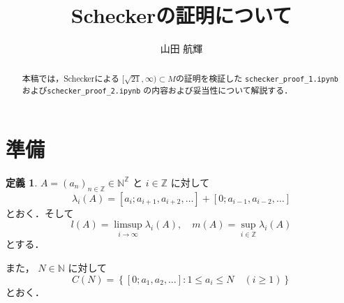 \documentclass[10pt,a4paper]{ujarticle}
\author{山田 航輝}
\title{Scheckerの証明について}
\theoremstyle{definition}
\newtheorem{definition}{定義}
\begin{document}
\maketitle

\begin{abstract}
本稿では，Schecker\cite{schecker}による $[\sqrt{21}, \infty) \subset M$の証明を検証した
\verb|schecker_proof_1.ipynb|および\verb|schecker_proof_2.ipynb|
の内容および妥当性について解説する．
\end{abstract}

\section{準備}
\begin{definition}
  \label{def:lagrange-spectrum}
  $A=(a_n)_{n\in\mathbb Z}\in\mathbb{N}^{\mathbb Z}$ と $i\in\mathbb Z$ に対して
  \[
    \lambda_i(A)
    =[a_i;a_{i+1},a_{i+2},\ldots]
     +[0;a_{i-1},a_{i-2},\ldots]
  \]
  とおく．そして
  \[
  l(A) = \limsup_{i\to \infty} \lambda_i(A), \quad m(A) = \sup_{i\in \mathbb{Z}} \lambda_i(A)
  \]
  とする．
  
  また，
    $N\in\mathbb{N}$ に対して
    \[
      C(N)=
      \left\{
        [0;a_1,a_2,\ldots]:1\le a_i\le N\quad(i\ge1)
      \right\}
    \]
    とおく．
\end{definition}
\end{document}
